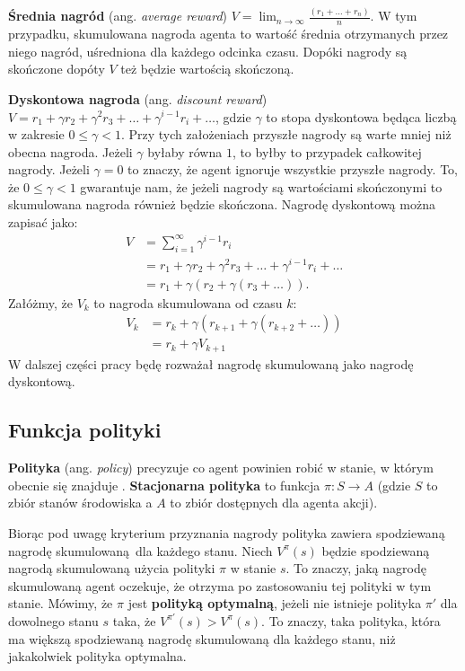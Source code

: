 \documentclass[a4paper, 12pt,oneside]{book}
\begin{document}
\textbf{Średnia nagród} (ang. \textit{average reward}) $V =
\lim_{n\to\infty}\frac{(r_1 + \dots + r_n)}{n}$. W tym przypadku, skumulowana
nagroda agenta to wartość średnia otrzymanych przez niego nagród, uśredniona
dla każdego odcinka czasu. Dopóki nagrody są skończone dopóty $V$ też będzie
wartością skończoną.

\textbf{Dyskontowa nagroda} (ang. \textit{discount reward}) $V = r_1 + \gamma
r_2 + \gamma^2 r_3 + \dots + \gamma^{i-1} r_i + \dots$, gdzie $\gamma$ to stopa
dyskontowa będąca liczbą w zakresie $0 \leq \gamma < 1$. Przy tych założeniach
przyszłe nagrody są warte mniej niż obecna nagroda. Jeżeli $\gamma$ byłaby
równa $1$, to byłby to przypadek całkowitej nagrody. Jeżeli $\gamma = 0$ to
znaczy, że agent ignoruje wszystkie przyszłe nagrody. To, że $0 \leq \gamma <
1$ gwarantuje nam, że jeżeli nagrody są wartościami skończonymi to skumulowana
nagroda również będzie skończona. Nagrodę dyskontową można zapisać jako:
\begin{equation} \label{discount_reward}
\begin{split}
	V &= \sum_{i=1}^{\infty} \gamma^{i - 1} r_i \\
	  &= r_1 + \gamma r_2 + \gamma^2 r_3 + \dots + \gamma^{i-1}r_i +\dots\\
	  &= r_1 + \gamma(r_2 +\gamma(r_3 + \dots)).
\end{split}
\end{equation}
Załóżmy, że $V_k$ to nagroda skumulowana od czasu $k$:
\begin{equation} \label{discount_reward_2}
\begin{split}
	V_k &= r_k + \gamma(r_{k+1} +\gamma(r_{k+2} + \dots))\\
	&= r_k + \gamma V_{k+1}
\end{split}
\end{equation}
W dalszej części pracy będę rozważał nagrodę skumulowaną jako nagrodę
dyskontową.

\subsection{Funkcja polityki}
\textbf{Polityka} (ang. \textit{policy}) precyzuje co agent powinien robić
w stanie, w którym obecnie się znajduje \cite{sawka_ml}.
\textbf{Stacjonarna polityka} to funkcja $\pi : S \rightarrow A$ (gdzie $S$ to
zbiór stanów środowiska a $A$ to zbiór dostępnych dla agenta akcji).

Biorąc pod uwagę kryterium przyznania nagrody polityka zawiera spodziewaną
nagrodę skumulowaną dla każdego stanu. Niech $V^{\pi}(s)$ będzie spodziewaną
nagrodą skumulowaną użycia polityki $\pi$ w stanie $s$. To znaczy, jaką nagrodę
skumulowaną agent oczekuje, że otrzyma po zastosowaniu tej polityki w tym
stanie. Mówimy, że $\pi$ jest \textbf{polityką optymalną}, jeżeli nie istnieje
polityka $\pi'$ dla dowolnego stanu $s$ taka, że $V^{\pi'}(s) > V^{\pi}(s)$. To
znaczy, taka polityka, która ma większą spodziewaną nagrodę skumulowaną dla
każdego stanu, niż jakakolwiek polityka optymalna.
\end{document}
